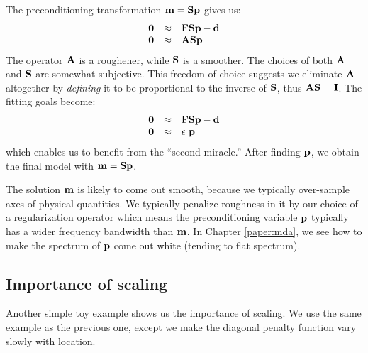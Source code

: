 \par
The preconditioning transformation
$\bold m = \bold S \bold p$
gives us:
\begin{equation}
        \begin{array}{lll}
        \bold 0 &\approx & \bold F \bold S \bold p - \bold d \\
        \bold 0 &\approx & \bold A \bold S \bold p
        \label{eqn:invintprecond}
        \end{array}
\end{equation}
The operator $\bold A$ is a roughener, while $\bold S$ is a smoother.
The choices of both $\bold A$ and $\bold S$ are somewhat subjective.
This freedom of choice suggests we eliminate $\bold A$ altogether
by {\em  defining} it to be proportional to the inverse of $\bold S$,
thus $\bold A\bold S=\bold I$.
The fitting goals become:
\begin{equation}
        \label{eqn:whitevar1}
        \begin{array}{lll}
        \bold 0 &\approx & \bold F  \bold S \bold p - \bold d \\
        \bold 0 &\approx & \epsilon\ \bold p
        \end{array}
\end{equation}
which enables us to benefit from the ``second miracle.''
After finding $\bold p$,
we obtain the final model with $\bold m = \bold S \bold p$.
\par
The solution $\bold m$ is likely to come out smooth,
because we typically over-sample axes of physical quantities.
We typically penalize roughness in it by our choice of a regularization operator
which means the preconditioning variable $\bold p$ typically
has a wider frequency bandwidth than $\bold m$.
In Chapter \ref{paper:mda}, we see
how to make the spectrum of $\bold p$
come out white (tending to flat spectrum).

\subsection{Importance of scaling}

Another simple toy example shows us the importance of scaling.
We use the same example as the previous one,
except we make the diagonal penalty function
vary slowly with location.

